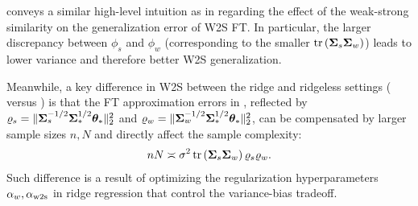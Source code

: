  conveys a similar high-level intuition as in  regarding the effect of the weak-strong similarity on the generalization error of W2S FT. In particular, the larger discrepancy between $\phi_s$ and $\phi_w$ (corresponding to the smaller $\mathop{\mathrm{tr}}\left(\boldsymbol{\Sigma}_s \boldsymbol{\Sigma}_w\right)$) leads to lower variance and therefore better W2S generalization.

Meanwhile, a key difference in W2S between the ridge and ridgeless settings ( versus ) is that the FT approximation errors in , reflected by $\varrho_s = \|\boldsymbol{\Sigma}_s^{-1/2} \boldsymbol{\Sigma}_*^{1/2} \boldsymbol{\theta}_*\|_2^2$ and $\varrho_w = \|\boldsymbol{\Sigma}_w^{-1/2} \boldsymbol{\Sigma}_*^{1/2} \boldsymbol{\theta}_*\|_2^2$, can be compensated by larger sample sizes $n, N$ and directly affect the sample complexity: 
\begin{align*}
    n N \asymp \sigma^2 \mathop{\mathrm{tr}}\left(\boldsymbol{\Sigma}_s \boldsymbol{\Sigma}_w\right) \varrho_s \varrho_w.
\end{align*}
Such difference is a result of optimizing the regularization hyperparameters $\alpha_w, \alpha_{\mathrm{w2s}}$ in ridge regression that control the variance-bias tradeoff.

